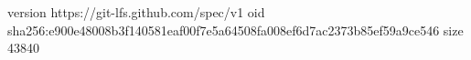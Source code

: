 version https://git-lfs.github.com/spec/v1
oid sha256:e900e48008b3f140581eaf00f7e5a64508fa008ef6d7ac2373b85ef59a9ce546
size 43840
